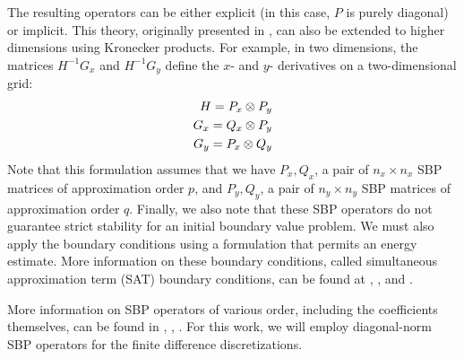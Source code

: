 The resulting operators can be either explicit (in this case, $P$ is purely diagonal) or implicit.
This theory, originally presented in \cite{strand1994summation}, can also be extended to higher
dimensions using Kronecker products.  For example, in two dimensions, the matrices $H^{-1} G_x$
and $H^{-1} G_y$ define the $x$- and $y$- derivatives on a two-dimensional grid:
\begin{align}
H = P_{x} \otimes P_{y} \notag \\
G_{x} = Q_{x} \otimes P_{y} \notag \\
G_{y} = P_{x} \otimes Q_{y} \notag
\end{align}
Note that this formulation assumes that we have ${P_{x},Q_{x}}$, a pair of $n_{x} \times n_{x}$ SBP
matrices of approximation order $p$, and ${P_{y},Q_{y}}$, a pair of $n_{y} \times n_{y}$ SBP matrices
of approximation order $q$. Finally, we also note that these SBP operators do not guarantee strict
stability for an initial boundary value problem. We must also apply the boundary conditions using a
formulation that permits an energy estimate. More information on these boundary conditions, called
simultaneous approximation term (SAT) boundary conditions, can be found at \cite{svard2007stable},
\cite{svard2008stable}, and \cite{bodony2010accuracy}.

More information on SBP operators of various order, including the coefficients themselves, can be found
in \cite{strand1994summation}, \cite{carpenter1993time}, \cite{mattsson2004stable}. For this work,
we will employ diagonal-norm SBP operators for the finite difference discretizations.

